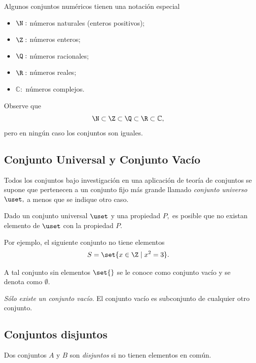  Algunos conjuntos num\'ericos tienen una notación especial
	\begin{itemize}
		\item $\N:$ números naturales (enteros positivos); 
		\item $\Z:$ números enteros; 
		\item $\Q:$ números racionales; 
		\item $\R:$ números reales; 
		\item $\mathbb{C}:$ números complejos.
	\end{itemize}
	
	



	Observe que
	$$
	\N \subset \Z \subset \Q \subset \R \subset \mathbb{C},
	$$ pero en ningún caso los conjuntos son iguales. 


\subsection{Conjunto Universal y Conjunto Vacío}


	Todos los conjuntos bajo investigación en una aplicación de teoría de conjuntos se supone que pertenecen a un conjunto fijo más grande llamado \emph{conjunto universo} $\uset,$ a menos que se indique otro caso.



	Dado un conjunto universal $\uset$ y una propiedad $P,$ es posible que no existan elemento de $\uset$ con la propiedad $P.$ 



	Por ejemplo, el siguiente conjunto no tiene elementos
	$$
	S=\set{x\in \Z \mid x^{2}=3}.
	$$



	A tal conjunto sin elementos $\set{}$ se le conoce como conjunto vacío y se denota como $\emptyset.$



	\begin{rem}
		\emph{Sólo existe un conjunto vacío}.  El conjunto vacío es subconjunto de cualquier otro conjunto.
	\end{rem}
	


\subsection{Conjuntos disjuntos}


	Dos conjuntos $A$ y $B$ son \emph{disjuntos} si no tienen elementos en común. 




